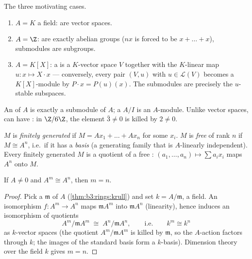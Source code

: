 \begin{example}\label{ex:b3:modules:examples}
The three motivating cases.
\begin{enumerate}
  \item $A = K$ a field:  are vector spaces.
  \item $A = \Z$:  are exactly abelian groups ($nx$ is
        forced to be $x + \dots + x$), submodules are subgroups.
  \item $A = K[X]$: a  is a $K$-vector space $V$ together
        with the $K$-linear map $u\colon x \mapsto X\cdot x$ ---
        conversely, every pair $(V, u)$ with $u \in \mathcal L(V)$
        becomes a $K[X]$-module by $P \cdot x = P(u)(x)$. The
        submodules are precisely the $u$-stable subspaces.
\end{enumerate}
An  of $A$ is exactly a submodule of $A$; a 
$A/I$ is an $A$-module. Unlike vector spaces,  can have
\emph{}: in $\Z/6\Z$, the element $\bar 3 \ne 0$ is killed
by $2 \neq 0$.
\end{example}

\begin{definition}\label{def:b3:modules:free}
$M$ is \emph{finitely generated}
if $M = Ax_1 + \dots + Ax_n$ for some $x_i$. $M$ is
\emph{free} of rank $n$ if $M \cong A^n$,
i.e.\ if it has a \emph{basis} (a generating family that is
$A$-linearly independent). Every finitely generated $M$ is a
quotient of a free : $(a_1, \dots, a_n) \mapsto \sum a_ix_i$
maps $A^n$ onto $M$.
\end{definition}

\begin{proposition}\label{prop:b3:modules:rank}
If $A \neq 0$ and $A^m \cong A^n$, then $m = n$.
\end{proposition}

\begin{proof}
Pick a  $\mathfrak m$ of $A$ (\cref{thm:b3:rings:krull})
and set $k = A/\mathfrak m$, a field. An isomorphism $f \colon A^m
\to A^n$ maps $\mathfrak m A^m$ into $\mathfrak m A^n$
(linearity), hence induces an isomorphism of quotients
\[
A^m/\mathfrak m A^m \;\cong\; A^n/\mathfrak m A^n,
\qquad\text{i.e.}\qquad k^m \cong k^n
\]
as $k$-vector spaces (the quotient $A^m/\mathfrak m A^m$ is
killed by $\mathfrak m$, so the $A$-action factors through $k$;
the images of the standard basis form a $k$-basis). Dimension
theory over the field $k$ gives $m = n$.
\end{proof}

